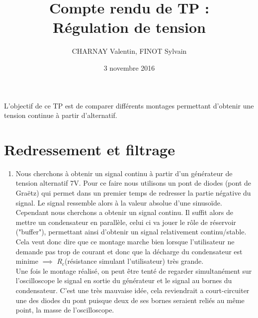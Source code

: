 \documentclass[12pt,a4paper]{article}
\date{3 novembre 2016}
\author{CHARNAY Valentin, FINOT Sylvain}
\title{Compte rendu de TP : \\ Régulation de tension}
\begin{document}
\maketitle
L'objectif de ce TP est de comparer différents montages permettant d'obtenir une tension continue à partir d'alternatif.
\section{Redressement et filtrage}
\begin{enumerate}
\item Nous cherchons à obtenir un signal continu à partir d'un générateur de tension alternatif 7V. Pour ce faire nous utilisons un pont de diodes (pont de Graëtz) qui permet dans un premier temps de redresser la partie négative du signal. Le signal ressemble alors à la valeur absolue d'une sinusoïde. Cependant nous cherchons a obtenir un signal continu. Il suffit alors de mettre un condensateur en parallèle, celui ci va jouer le rôle de réservoir ("buffer"), permettant ainsi d'obtenir un signal relativement continu/stable. Cela veut donc dire que ce montage marche bien lorsque l'utilisateur ne demande pas trop de courant et donc que la décharge du condensateur est minime $\implies$ $R_{c}$(résistance simulant l'utilisateur) très grande.\\
Une fois le montage réalisé, on peut être tenté de regarder simultanément sur l'oscilloscope le signal en sortie du générateur et le signal au bornes du condensateur. C'est une très mauvaise idée, cela reviendrait a court-circuiter une des diodes du pont puisque deux de ses bornes seraient reliés au même point, la masse de l'oscilloscope.


\end{enumerate}
\end{document}
